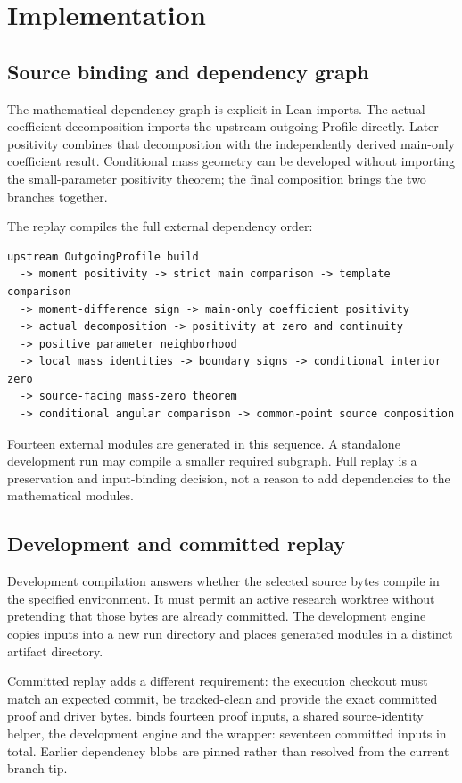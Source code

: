 \documentclass[11pt,a4paper]{article}
\begin{document}
\section{Implementation}

\subsection{Source binding and dependency graph}

The mathematical dependency graph is explicit in Lean imports. The actual-coefficient decomposition imports the upstream outgoing Profile directly. Later positivity combines that decomposition with the independently derived main-only coefficient result. Conditional mass geometry can be developed without importing the small-parameter positivity theorem; the final composition brings the two branches together.

The replay compiles the full external dependency order:

\begin{lstlisting}
upstream OutgoingProfile build
  -> moment positivity -> strict main comparison -> template comparison
  -> moment-difference sign -> main-only coefficient positivity
  -> actual decomposition -> positivity at zero and continuity
  -> positive parameter neighborhood
  -> local mass identities -> boundary signs -> conditional interior zero
  -> source-facing mass-zero theorem
  -> conditional angular comparison -> common-point source composition
\end{lstlisting}

Fourteen external modules are generated in this sequence. A standalone development run may compile a smaller required subgraph. Full replay is a preservation and input-binding decision, not a reason to add dependencies to the mathematical modules.

\subsection{Development and committed replay}

Development compilation answers whether the selected source bytes compile in the specified environment. It must permit an active research worktree without pretending that those bytes are already committed. The development engine copies inputs into a new run directory and places generated modules in a distinct artifact directory.

Committed replay adds a different requirement: the execution checkout must match an expected commit, be tracked-clean and provide the exact committed proof and driver bytes.  binds fourteen proof inputs, a shared source-identity helper, the development engine and the wrapper: seventeen committed inputs in total. Earlier dependency blobs are pinned rather than resolved from the current branch tip.
\end{document}
